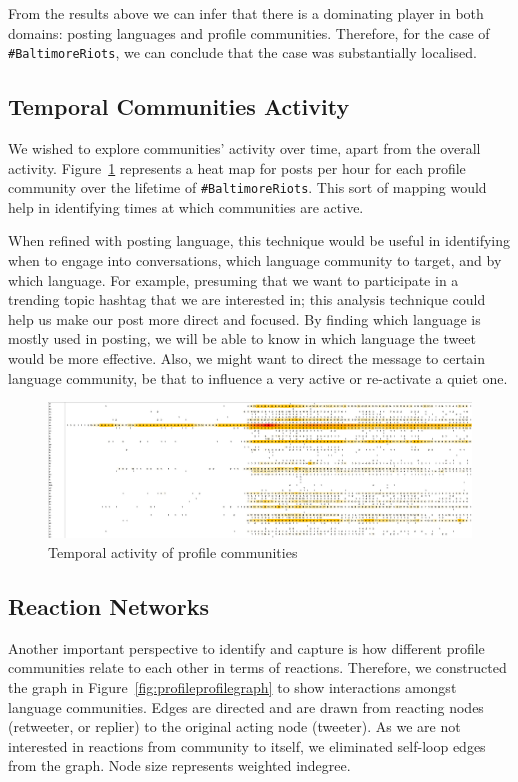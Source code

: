 \documentclass[conference]{IEEEtran}
\begin{document}
From the results above we can infer that there is a dominating player
in both domains: posting languages and profile communities. Therefore,
for the case of {\texttt{\#BaltimoreRiots}}, we can conclude that the case was
substantially localised.


\subsection{Temporal Communities Activity}

We wished to explore communities' activity over time, apart from the
overall activity. Figure~\ref{fig:heatmap} represents a heat map for
posts per hour for each profile community over the lifetime of
{\texttt{\#BaltimoreRiots}}. This sort of mapping would help in
identifying times at which communities are active.

When refined with posting language, this technique would be useful in
identifying when to engage into conversations, which language
community to target, and by which language. For example, presuming
that we want to participate in a trending topic hashtag that we are
interested in; this analysis technique could help us make our post
more direct and focused. By finding which language is mostly used in
posting, we will be able to know in which language the tweet would be
more effective. Also, we might want to direct the message to certain
language community, be that to influence a very active or re-activate
a quiet one.

\begin{figure}[!h]
\centering
\includegraphics[width=\textwidth]{images/heatmap.png}
\caption{Temporal activity of profile communities}
\label{fig:heatmap}
\end{figure}


\subsection{Reaction Networks}

Another important perspective to identify and capture is how different
profile communities relate to each other in terms of
reactions. Therefore, we constructed the graph in
Figure~\ref{fig:profileprofilegraph} to show interactions amongst
language communities. Edges are directed and are drawn from reacting
nodes (retweeter, or replier) to the original acting node
(tweeter). As we are not interested in reactions from community to
itself, we eliminated self-loop edges from the graph. Node size
represents weighted indegree.
\end{document}
